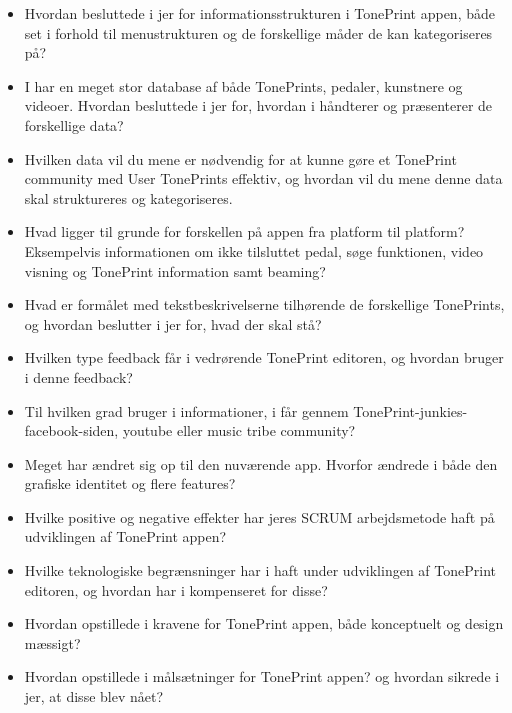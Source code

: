 \begin{itemize}
  \item Hvordan besluttede i jer for informationsstrukturen i TonePrint appen, både set i forhold til menustrukturen og de forskellige måder de kan kategoriseres på?\\
  \item I har en meget stor database af både TonePrints, pedaler, kunstnere og videoer. Hvordan besluttede i jer for,  hvordan i håndterer og præsenterer de forskellige data?\\
  \item Hvilken data vil du mene er nødvendig for at kunne gøre et TonePrint community med User TonePrints effektiv, og hvordan vil du mene denne data skal struktureres og kategoriseres.\\
  \item Hvad ligger til grunde for forskellen på appen fra platform til platform? Eksempelvis informationen om ikke tilsluttet pedal, søge funktionen, video visning og TonePrint information samt beaming?\\
  \item Hvad er formålet med tekstbeskrivelserne tilhørende de forskellige TonePrints, og hvordan beslutter i jer for, hvad der skal stå?\\
\end{itemize}

\begin{itemize}
  \item Hvilken type feedback får i vedrørende TonePrint editoren, og hvordan bruger i denne feedback?\\
  \item Til hvilken grad bruger i informationer, i får gennem TonePrint-junkies-facebook-siden, youtube eller music tribe community?\\ 
  \item Meget har ændret sig op til den nuværende app. Hvorfor ændrede i både den grafiske identitet og flere features?\\
  \item Hvilke positive og negative effekter har jeres SCRUM arbejdsmetode haft på udviklingen af TonePrint appen?\\
  \item Hvilke teknologiske begrænsninger har i haft under udviklingen af TonePrint editoren, og hvordan har i kompenseret for disse?\\
  \item Hvordan opstillede i kravene for TonePrint appen, både konceptuelt og design mæssigt?\\
  \item Hvordan opstillede i målsætninger for TonePrint appen? og hvordan sikrede i jer, at disse blev nået?\\
\end{itemize}

